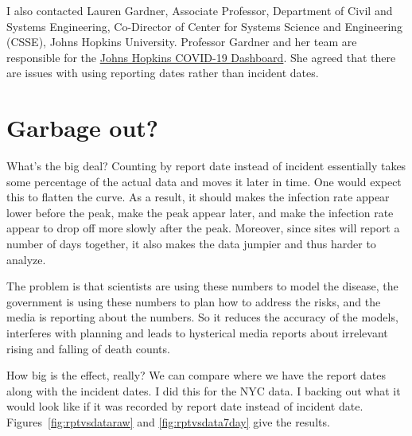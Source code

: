 \documentclass[10pt,reqno]{amsart}
\begin{document}



I also contacted Lauren Gardner, Associate Professor, Department of
Civil and Systems Engineering, Co-Director of Center for Systems
Science and Engineering (CSSE), Johns Hopkins University.  Professor
Gardner and her team are responsible for the
\href{https://coronavirus.jhu.edu/map.html}{Johns Hopkins COVID-19
  Dashboard}.  She agreed that there are issues with using reporting
dates rather than incident dates.\cite{Gardner2020Dates}


\section{Garbage out?}

What's the big deal?  Counting by report date instead of incident
essentially takes some percentage of the actual data and moves it
later in time.  One would expect this to flatten the curve.  As a
result, it should makes the infection rate appear lower before the
peak, make the peak appear later, and make the infection rate appear
to drop off more slowly after the peak.  Moreover, since sites will
report a number of days together, it also makes the data jumpier and
thus harder to analyze.

The problem is that scientists are using these numbers to model the
disease, the government is using these numbers to plan
how to address the risks, and the media is reporting about the
numbers.  So it reduces the accuracy of the models, interferes with
planning and leads to hysterical media reports about irrelevant rising
and falling of death counts.

How big is the effect, really?  We can compare where we have the
report dates along with the incident dates.  I did this for the NYC data.
I backing out what it would look like if it was recorded by
report date instead of incident date.  Figures~\ref{fig:rptvsdataraw}
and \ref{fig:rptvsdata7day} give the results.
\end{document}
